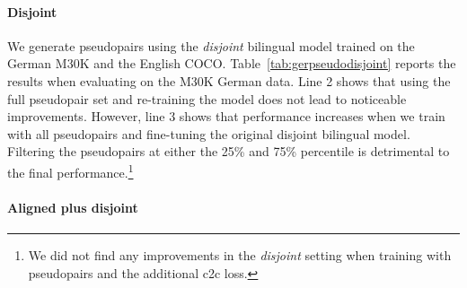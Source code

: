 \begin{comment}
We first train either 
the \emph{disjoint} (De+COCO) or the 
\emph{aligned plus disjoint} (En+De+COCO) model 
and use it do generate pseudopairs creating a synthetic
German-COCO set:
for each sentence in COCO we retrieve the most similar 
German M30K
caption and label the COCO images with this new set of sentences.
We also investigate the effect of filtering the pseudopairs 
by training
on the full synthetic data set or only keeping
samples from the 75\% or 25\% percentiles. 
Lastly, we compare training our models from scratch 
with the added generated pseudopair set or 
continue training the "parent" model (fine-tune).
\end{comment}

\paragraph{Disjoint}

We generate pseudopairs using the 
\emph{disjoint} bilingual model trained on 
the German M30K and the English COCO.
Table~\ref{tab:gerpseudodisjoint} reports the results
when evaluating on the M30K German data.
Line 2 shows that using the full pseudopair set
and re-training the model does not lead to 
noticeable improvements. However, line 3 shows that performance increases when we train with all pseudopairs and fine-tuning the original disjoint bilingual model. Filtering the pseudopairs at either the 25\% and 75\% percentile is 
detrimental to the final performance.\footnote{
We did not find any improvements
in the \emph{disjoint} setting when training with pseudopairs and the additional c2c loss.}


\paragraph{Aligned plus disjoint}

